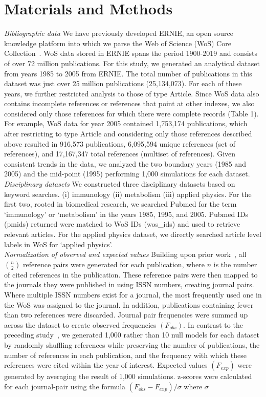 \documentclass[NETN]{stjour}
\begin{document}
\section{Materials and Methods}
\emph{Bibliographic data} We have previously developed ERNIE, an open source knowledge platform into which we parse the Web of Science (WoS) Core Collection~\citep{Keserci371955}. WoS data stored in ERNIE spans the period 1900-2019 and consists of over 72 million publications. For this study, we generated an analytical dataset from years 1985 to 2005 from ERNIE. The total number of publications in this dataset was just over 25 million publications (25,134,073).  For each of these years, we further restricted analysis to those of type Article. Since WoS data also contains incomplete references or references that point at other indexes,  we also considered only those references for which there were complete records (Table 1). For example, WoS data for year 2005 contained 1,753,174 publications, which after restricting to type Article and considering only those references described above resulted in 916,573 publications, 6,095,594 unique references (set of references), and 17,167,347 total references (multiset of references). Given consistent trends in the data, we analyzed the two boundary years (1985 and 2005) and the mid-point (1995) performing 1,000 simulations for each dataset. \\
\emph{Disciplinary datasets} We constructed three disciplinary datasets based on keyword searches. (i) immunology (ii) metabolism (iii) applied physics. For the first two, rooted in biomedical research, we searched Pubmed for the term `immunology' or `metabolism' in the years 1985, 1995, and 2005. Pubmed IDs (pmids) returned were matched to WoS IDs (wos\_ids) and used to retrieve relevant articles. For the applied physics dataset, we directly searched article level labels in WoS for `applied physics'. \\
\emph{Normalization of observed and expected values} Building upon prior work~\cite{uzzi_atypical_2013}, all ${n \choose 2}$ reference pairs were generated for each publication, where $n$ is the number of cited references in the publication. These reference pairs were then mapped to the journals they were published in using ISSN numbers,  creating journal pairs. Where multiple ISSN numbers exist for a journal, the most frequently used one in the WoS was assigned to the journal. In addition, publications containing fewer than two references were discarded. Journal pair frequencies were summed up across the dataset to create observed frequencies $(F_{obs})$. In contrast to the preceding study~\citep{uzzi_atypical_2013}, we generated 1,000 rather than 10 null models for each dataset by randomly shuffling references while preserving the number of publications, the number of references in each publication, and the frequency with which these references were cited within the year of interest. Expected values $(F_{exp})$ were generated by averaging the result of 1,000 simulations. z-scores were calculated for each journal-pair using the formula $(F_{obs} - F_{exp})/\sigma$ where $\sigma$
\end{document}
